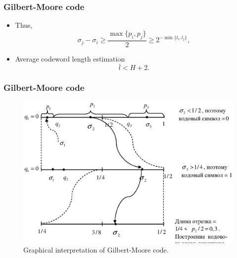 \documentclass[14pt]{beamer}
\begin{document}
\begin{frame}
\frametitle{Gilbert-Moore code}
\begin{itemize}    

    \item Thus,
    \[
    \sigma _j - \sigma _i \ge
    \frac{\max \{p_i ,p_j \}}{2} \ge 2^{ - \min \{l_i ,l_j \}},
    \]
    
    \item Average codeword length estimation
    \[
    \bar {l} < H + 2.
    \]

\end{itemize}
\end{frame}


\begin{frame}
\frametitle{Gilbert-Moore code}
\begin{itemize}    

\begin{figure}[ht]
\begin{minipage}{1.0\linewidth}
\includegraphics[width=1.0\textwidth]{fig2_8.eps}
\caption{Graphical interpretation of Gilbert-Moore code.}
\label{GM_graph}
\end{minipage}
\end{figure}

\end{itemize}
\end{frame}

\end{document}
